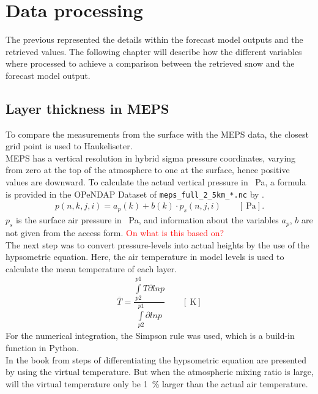 \section{Data processing} \label{sec:data_proc}
The previous  represented the details within the forecast model outputs and the retrieved values. The following chapter will describe how the different variables where processed to achieve a comparison between the retrieved snow and the forecast model output. 

\subsection{Layer thickness in MEPS}\label{sec:layer_thickness}
To compare the measurements from the surface with the MEPS data, the closest grid point is used to Haukeliseter.
\\
MEPS has a vertical resolution in hybrid sigma pressure coordinates, varying from zero at the top of the atmosphere to one at the surface, hence positive values are downward. To calculate the actual vertical pressure in \SI{}{\Pa}, a formula is provided in the OPeNDAP Dataset of \texttt{meps\_full\_2\_5km\_*.nc} by \cite{norwegian_meteorological_institute_met_2016}.  
\begin{align}
	p(n,k,j,i) = a_p(k) + b(k) \cdot p_s(n,j,i) \qquad [\SI{}{\Pa}].
	\label{eq:hybrid_sigma_pressure}
\end{align}
$p_s$ is the surface air pressure in \SI{}{\Pa}, and information about the variables $a_p$, $b$ are not given from the access form. \textcolor{red}{On what is this based on?}  
\\
The next step was to convert pressure-levels into actual heights by the use of the hypsometric equation. Here, the air temperature in model levels is used to calculate the mean temperature of each layer. 
\begin{align}
	\overline{T} = \dfrac{\int\limits_{p2}^{p1} T \partial ln p}{\int\limits_{p2}^{p1}\partial ln p} \qquad [\SI{}{\kelvin}]
	\label{eq:T_avg}
\end{align}
For the numerical integration, the Simpson rule was used, which is a build-in function in Python. \\
In the book from \cite{martin_mid-latitude_2006} steps of differentiating the hypsometric equation are presented by using the virtual temperature. But when the atmospheric mixing ratio is large, will the virtual temperature only be \SI{1}{\percent} larger than the actual air temperature. 
